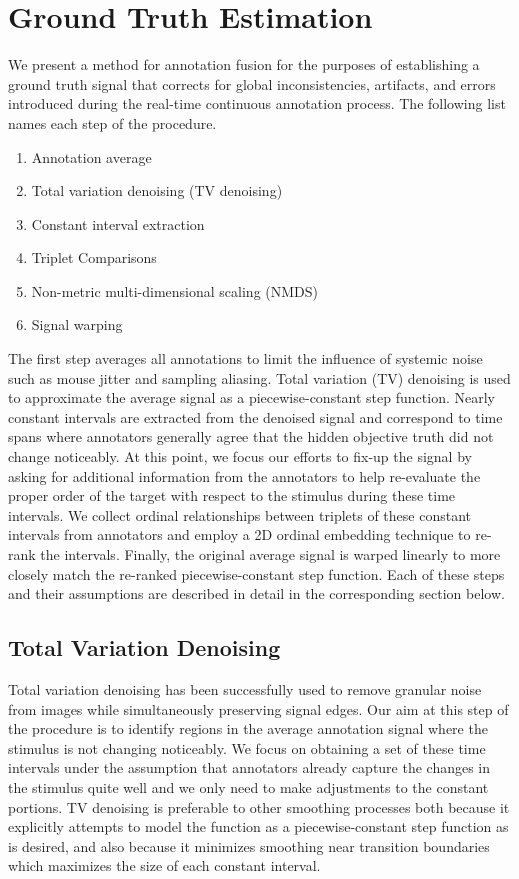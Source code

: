 \documentclass[]{article}
\begin{document}
\section{Ground Truth Estimation}

We present a method for annotation fusion for the purposes of establishing a ground truth signal that corrects for global inconsistencies, artifacts, and errors introduced during the real-time continuous annotation process.  The following list names each step of the procedure.

\begin{enumerate}
	\item Annotation average
	\item Total variation denoising (TV denoising)
	\item Constant interval extraction
	\item Triplet Comparisons
	\item Non-metric multi-dimensional scaling (NMDS)
	\item Signal warping
\end{enumerate}

The first step averages all annotations to limit the influence of systemic noise such as mouse jitter and sampling aliasing.  Total variation (TV) denoising is used to approximate the average signal as a piecewise-constant step function.  Nearly constant intervals are extracted from the denoised signal and correspond to time spans where annotators generally agree that the hidden objective truth did not change noticeably.  At this point, we focus our efforts to fix-up the signal by asking for additional information from the annotators to help re-evaluate the proper order of the target with respect to the stimulus during these time intervals.  We collect ordinal relationships between triplets of these constant intervals from annotators and employ a 2D ordinal embedding technique to re-rank the intervals.  Finally, the original average signal is warped linearly to more closely match the re-ranked piecewise-constant step function.  Each of these steps and their assumptions are described in detail in the corresponding section below.

\subsection{Total Variation Denoising}
Total variation denoising has been successfully used to remove granular noise from images while simultaneously preserving signal edges.  Our aim at this step of the procedure is to identify regions in the average annotation signal where the stimulus is not changing noticeably.  We focus on obtaining a set of these time intervals under the assumption that annotators already capture the changes in the stimulus quite well and we only need to make adjustments to the constant portions.  TV denoising is preferable to other smoothing processes both because it explicitly attempts to model the function as a piecewise-constant step function as is desired, and also because it minimizes smoothing near transition boundaries which maximizes the size of each constant interval.
\end{document}
